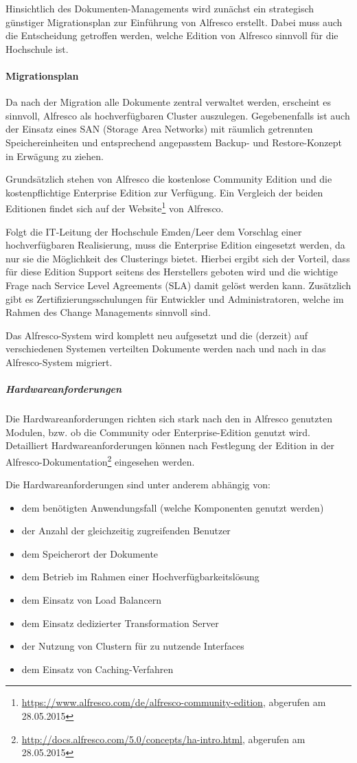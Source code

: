 Hinsichtlich des Dokumenten-Managements wird zunächst ein strategisch günstiger Migrationsplan zur Einführung von Alfresco erstellt. Dabei muss auch die Entscheidung getroffen werden, welche Edition von Alfresco sinnvoll für die Hochschule ist.

\paragraph{Migrationsplan}
Da nach der Migration alle Dokumente zentral verwaltet werden, erscheint es sinnvoll, Alfresco als hochverfügbaren Cluster auszulegen. Gegebenenfalls ist auch der Einsatz eines SAN (Storage Area Networks) mit räumlich getrennten Speichereinheiten und entsprechend angepasstem Backup- und Restore-Konzept in Erwägung zu ziehen.

Grundsätzlich stehen von Alfresco die kostenlose Community Edition und die kostenpflichtige Enterprise Edition zur Verfügung. Ein Vergleich der beiden Editionen findet sich auf der Website\footnote{\url{https://www.alfresco.com/de/alfresco-community-edition}, abgerufen am 28.05.2015} von Alfresco.

Folgt die IT-Leitung der Hochschule Emden/Leer dem Vorschlag einer hochverfügbaren Realisierung, muss die Enterprise Edition eingesetzt werden, da nur sie die Möglichkeit des Clusterings bietet. Hierbei ergibt sich der Vorteil, dass für diese Edition Support seitens des Herstellers geboten wird und die wichtige Frage nach Service Level Agreements (SLA) damit gelöst werden kann. Zusätzlich gibt es Zertifizierungsschulungen für Entwickler und Administratoren, welche im Rahmen des Change Managements sinnvoll sind.

Das Alfresco-System wird komplett neu aufgesetzt und die (derzeit) auf verschiedenen Systemen verteilten Dokumente werden nach und nach in das Alfresco-System migriert.

\subparagraph{Hardwareanforderungen}
Die Hardwareanforderungen richten sich stark nach den in Alfresco genutzten Modulen, bzw. ob die Community oder Enterprise-Edition genutzt wird. Detailliert Hardwareanforderungen können nach Festlegung der Edition in der Alfresco-Dokumentation\footnote{\url{http://docs.alfresco.com/5.0/concepts/ha-intro.html}, abgerufen am 28.05.2015} eingesehen werden. 

Die Hardwareanforderungen sind unter anderem abhängig von:

\begin{itemize}
	\item dem benötigten Anwendungsfall (welche Komponenten genutzt werden)
	\item der Anzahl der gleichzeitig zugreifenden Benutzer
	\item dem Speicherort der Dokumente
	\item dem Betrieb im Rahmen einer Hochverfügbarkeitslösung
	\item dem Einsatz von Load Balancern
	\item dem Einsatz dedizierter Transformation Server
	\item der Nutzung von Clustern für zu nutzende Interfaces
	\item dem Einsatz von Caching-Verfahren
\end{itemize}

